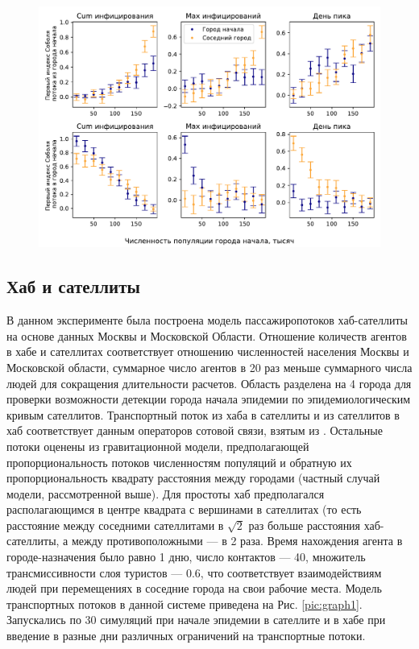 \documentclass[a4paper,12pt]{article} %
\begin{document}
\begin{figure}[H]
    \centering
    \includegraphics[width=\linewidth]{images/bignsmall_bars.pdf}
    \caption{}
\end{figure}




\subsection{Хаб и сателлиты}
В данном эксперименте была построена модель пассажиропотоков хаб-сателлиты на основе данных Москвы и Московской Области. Отношение количеств агентов в хабе и сателлитах соответствует отношению численностей населения Москвы и Московской области, суммарное число агентов в 20 раз меньше суммарного числа людей для сокращения длительности расчетов. Область разделена на 4 города для проверки возможности детекции города начала эпидемии по эпидемиологическим кривым сателлитов. Транспортный поток из хаба в сателлиты и из сателлитов в хаб соответствует данным операторов сотовой связи, взятым из \cite{makhrova2017work}. Остальные потоки оценены из гравитационной модели, предполагающей пропорциональность потоков численностям популяций и обратную их пропорциональность квадрату расстояния между городами (частный случай модели, рассмотренной выше). Для простоты хаб предполагался располагающимся в центре квадрата с вершинами в сателлитах (то есть расстояние между соседними сателлитами в $\sqrt{2}$ раз больше расстояния хаб-сателлиты, а между противоположными --- в 2 раза. Время нахождения агента в городе-назначения было равно 1 дню, число контактов --- 40, множитель трансмиссивности слоя туристов --- 0.6, что соответствует взаимодействиям людей при перемещениях в соседние города на свои рабочие места. Модель транспортных потоков в данной системе приведена на Рис. \ref{pic:graph1}. Запускались по 30 симуляций при начале эпидемии в сателлите и в хабе при введение в разные дни различных ограничений на транспортные потоки.
\end{document}
